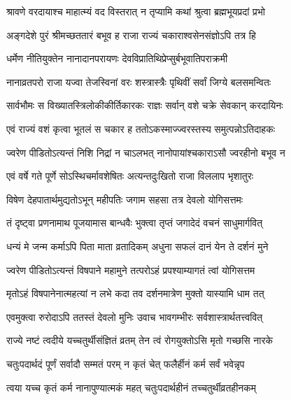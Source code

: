 \twolineshloka
{श्रावणे वरदायाश्च माहात्म्यं वद विस्तरात्}
{न तृप्यामि कथां श्रुत्वा ब्रह्मभूयप्रदां प्रभो} %


\twolineshloka
{अङ्गदेशे पुरं श्रीमच्छततारं बभूव ह}
{राजा राज्यं चकाराश्वसेनसंज्ञोऽपि तत्र हि} %

\twolineshloka
{धर्मेण नीतियुक्तेन नानादानपरायणः}
{देवविप्रातिथिप्रेप्सुर्बभूवातिपराक्रमी} %

\twolineshloka
{नानाव्रतपरो राजा यज्वा तेजस्विनां वरः}
{शस्त्रास्त्रैः पृथिवीं सर्वां जिग्ये बलसमन्वितः} %

\twolineshloka
{सार्वभौमः स विख्यातस्त्रिलोकीकीर्तिकारकः}
{राज्ञः सर्वान् वशे चक्रे सेवकान् करदायिनः} %

\twolineshloka
{एवं राज्यं वशं कृत्वा भूतलं स चकार ह}
{ततोऽकस्माज्ज्वरस्तस्य समुत्पन्नोऽतिदाहकः} %

\twolineshloka
{ज्वरेण पीडितोऽत्यन्तं निशि निद्रां न चाऽलभत्}
{नानोपायांश्चकाराऽसौ ज्वरहीनो बभूव न} %

\twolineshloka
{एवं वर्षे गते पूर्णे सोऽस्थिचर्मावशेषितः}
{अत्यन्तदुःखितो राजा विललाप भृशातुरः} %

\twolineshloka
{विषेण देहपातार्थमुद्यतोऽभून् महीपतिः}
{जगाम सहसा तत्र देवलो योगिसत्तमः} %

\twolineshloka
{तं दृष्ट्वा प्रणनामाथ पूजयामास बान्धवैः}
{भुक्त्वा तृप्तं जगादेदं वचनं साधुमार्गवित्} %


\twolineshloka
{धन्यं मे जन्म कर्माऽपि पिता माता व्रतादिकम्}
{अधुना सफलं दानं येन ते दर्शनं मुने} %

\twolineshloka
{ज्वरेण पीडितोऽत्यन्तं विषपाने महामुने}
{तत्परोऽहं प्रपश्याम्यागतं त्वां योगिसत्तम} %

\twolineshloka
{मृतोऽहं विषपानेनात्महत्यां न लभे कदा}
{तव दर्शनमात्रेण मुक्तो यास्यामि धाम तत्} %

\twolineshloka
{एवमुक्त्वा रुरोदाऽपि ततस्तं देवलो मुनिः}
{उवाच भावगम्भीरः सर्वशास्त्रार्थतत्त्ववित्} %


\twolineshloka
{राज्ये नष्टं त्वदीये यच्चतुर्थीसंज्ञितं व्रतम्}
{तेन त्वं रोगयुक्तोऽसि मृतो गच्छसि नारके} %

\twolineshloka
{चतुःपदार्थदं पूर्णं सर्वादौ सम्मतं परम्}
{न कृतं चेत् फलैर्हीनं कर्म सर्वं भवेन्नृप} %

\twolineshloka
{त्वया यच्च कृतं कर्म नानापुण्यात्मकं महत्}
{चतुःपदार्थहीनं तच्चतुर्थीव्रतहीनकम्} %

